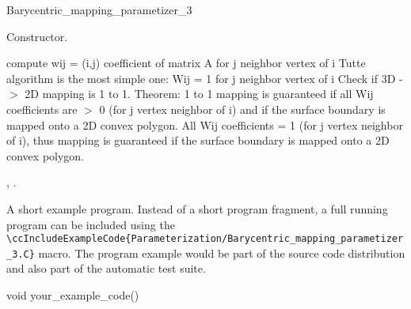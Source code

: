 \begin{ccRefClass}{Barycentric_mapping_parametizer_3}
\ccCreation
{}  %

{
Constructor.
}


\ccOperations

{
compute wij = (i,j) coefficient of matrix A for j neighbor vertex of i
Tutte algorithm is the most simple one: Wij = 1 for j neighbor vertex of i
}
{
Check if 3D -$>$ 2D mapping is 1 to 1.
Theorem: 1 to 1 mapping is guaranteed if all Wij coefficients are $>$ 0 (for j vertex neighbor of i) and if the surface boundary is mapped onto a 2D convex polygon. All Wij coefficients = 1 (for j vertex neighbor of i), thus mapping is guaranteed if the surface boundary is mapped onto a 2D convex polygon.
}


\ccSeeAlso

,
.

\ccExample

A short example program.
Instead of a short program fragment, a full running program can be
included using the
\verb|\ccIncludeExampleCode{Parameterization/Barycentric_mapping_parametizer_3.C}|
macro. The program example would be part of the source code distribution and
also part of the automatic test suite.

\begin{ccExampleCode}
void your_example_code() {
}
\end{ccExampleCode}


\end{ccRefClass}


